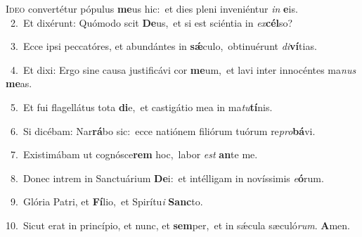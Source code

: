 \lettrine{\initial\textcolor{\initialcolor}{I}}{deo} convertétur pópulus \textbf{me}\-us hic:~\star et dies pleni inveniéntur \textit{in} \textbf{e}\-is.\\
{\numbfont\textcolor{\numbcolor}{~2.}}~Et dixérunt: Quómodo scit \textbf{De}\-us,~\star et si est sciéntia in \textit{ex}\-\textbf{cél}so?\par
{\numbfont\textcolor{\numbcolor}{~3.}}~Ecce ipsi peccatóres, et abundántes in \textbf{sǽ}\-culo,~\star obtinuérunt \textit{di}\-\textbf{ví}tias.\par
{\numbfont\textcolor{\numbcolor}{~4.}}~Et dixi: Ergo sine causa justificávi cor \textbf{me}\-um,~\star et lavi inter innocéntes ma\textit{nus} \textbf{me}\-as.\par
{\numbfont\textcolor{\numbcolor}{~5.}}~Et fui flagellátus tota \textbf{di}\-e,~\star et castigátio mea in ma\-\textit{tu}\-\textbf{tí}nis.\par
{\numbfont\textcolor{\numbcolor}{~6.}}~Si dicébam: Nar\-\textbf{rá}\-bo sic:~\star ecce natiónem filiórum tuórum re\-\textit{pro}\-\textbf{bá}vi.\par
{\numbfont\textcolor{\numbcolor}{~7.}}~Existimábam ut cognósce\textbf{rem} hoc,~\star labor \textit{est} \textbf{an}\-te me.\par
{\numbfont\textcolor{\numbcolor}{~8.}}~Donec intrem in Sanctuárium \textbf{De}\-i:~\star et intélligam in novíssimis \textit{e}\-\textbf{ó}rum.\par
{\numbfont\textcolor{\numbcolor}{~9.}}~Glória Patri, et \textbf{Fí}\-lio,~\star et Spirítu\textit{i} \textbf{Sanc}\-to.\par
{\numbfont\textcolor{\numbcolor}{10.}}~Sicut erat in princípio, et nunc, et \textbf{sem}\-per,~\star et in sǽcula sæculó\-\textit{rum}\-. \textbf{A}\-men.\par
